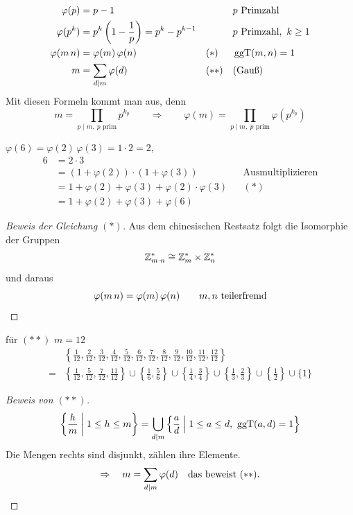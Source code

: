 \begin{satz}
\begin{align*}
\varphi(p) &= p - 1 && && p \text{ Primzahl} \\
\varphi(p^k) &= p^k \left( 1 - \frac{1}{p} \right) = p^k - p^{k-1} && && p \text{ Primzahl},\ k \geq 1 \\
\varphi(m\,n) &= \varphi(m)\, \varphi(n) && (*) && \operatorname{ggT}(m, n) = 1 \\
m &= \sum_{d \mid m} \varphi(d) && (**) && \text{(Gauß)}
\end{align*}
Mit diesen Formeln kommt man aus, denn
\[ m = \prod_{p \mid m,\ p \text{ prim}} p^{k_p} \qquad \Rightarrow \qquad \varphi(m) = \prod_{p \mid m,\ p \text{ prim}} \varphi\left(p^{k_p}\right) \]
\end{satz}

\begin{beispiel}
$\varphi(6) = \varphi(2)\, \varphi(3) = 1 \cdot 2 = 2$,
\begin{align*}
6 &= 2 \cdot 3 \\
&= (1 + \varphi(2)) \cdot (1 + \varphi(3)) && \text{Ausmultiplizieren} \\
&= 1 + \varphi(2) + \varphi(3) + \varphi(2) \cdot \varphi(3) && (*) \\
&= 1 + \varphi(2) + \varphi(3) + \varphi(6)
\end{align*}
\end{beispiel}

\begin{proof}[Beweis der Gleichung $(*)$]
Aus dem chinesischen Restsatz folgt die Isomorphie der Gruppen
\[ \mathbb{Z}_{m \cdot n}^* \cong \mathbb{Z}_{m}^* \times \mathbb{Z}_{n}^* \]
und daraus
\[ \varphi(m\,n) = \varphi(m)\, \varphi(n) \qquad m, n \text{ teilerfremd} \qedhere \]
\end{proof}

\begin{beispiel}
für $(**)$ $m = 12$
\begin{align*}
&\left\{ \frac{1}{12}, \frac{2}{12}, \frac{3}{12}, \frac{4}{12}, \frac{5}{12}, \frac{6}{12}, \frac{7}{12}, \frac{8}{12}, \frac{9}{12}, \frac{10}{12}, \frac{11}{12}, \frac{12}{12} \right\} \\
= &\left\{ \frac{1}{12}, \frac{5}{12}, \frac{7}{12}, \frac{11}{12} \right\} \cup \left\{ \frac{1}{6}, \frac{5}{6} \right\} \cup \left\{ \frac{1}{4}, \frac{3}{4} \right\} \cup \left\{ \frac{1}{3}, \frac{2}{3} \right\} \cup \left\{ \frac{1}{2} \right\} \cup \{1\}
\end{align*}
\end{beispiel}

\begin{proof}[Beweis von $(**)$]
\[ \left\{ \frac{h}{m} \;\middle|\; 1 \leq h \leq m \right\} = \bigcup_{d \mid m} \left\{ \frac{a}{d} \;\middle|\; 1 \leq a \leq d,\ \operatorname{ggT}(a, d) = 1 \right\} \]
Die Mengen rechts sind disjunkt, zählen ihre Elemente.
\[ \Rightarrow \quad m = \sum_{d \mid m} \varphi(d) \quad \text{das beweist } (**). \qedhere \]
\end{proof}
